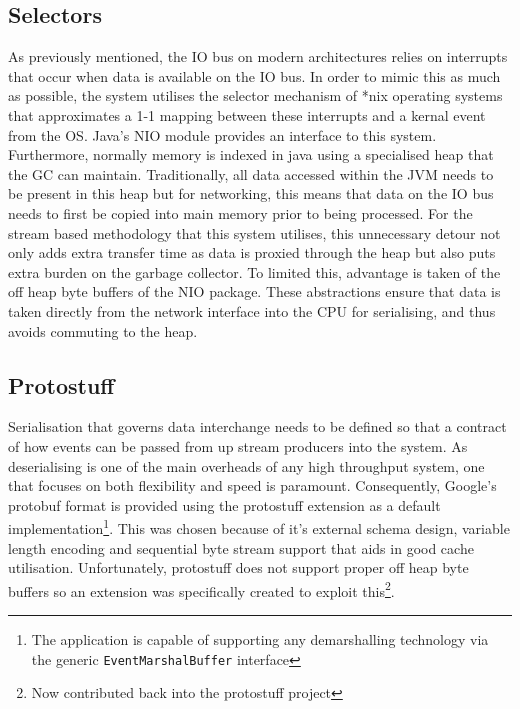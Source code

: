 \documentclass[a4paper,11pt]{scrreprt}
\begin{document}
\subsection{Selectors}
As previously mentioned, the IO bus on modern architectures relies on interrupts that occur when data is available on the IO bus. In order to mimic this as much as possible, the system utilises the selector mechanism of *nix operating systems that approximates a 1-1 mapping between these interrupts and a kernal event from the OS. Java's NIO module provides an interface to this system. Furthermore, normally memory is indexed in java using a specialised heap that the GC can maintain. Traditionally, all data accessed within the JVM needs to be present in this heap but for networking, this means that data on the IO bus needs to first be copied into main memory prior to being processed. For the stream based methodology that this system utilises, this unnecessary detour not only adds extra transfer time as data is proxied through the heap but also puts extra burden on the garbage collector.
To limited this, advantage is taken of the off heap byte buffers of the NIO package. These abstractions ensure that data is taken directly from the network interface into the CPU for serialising, and thus avoids commuting to the heap.
\subsection{Protostuff}
Serialisation that governs data interchange needs to be defined so that a contract of how events can be passed from up stream producers into the system. As deserialising is one of the main overheads of any high throughput system, one that focuses on both flexibility and speed is paramount. Consequently, Google's protobuf\cite{googleprotobuf} format is provided using the protostuff extension as a default implementation\footnote{The application is capable of supporting any demarshalling technology via the generic \texttt{EventMarshalBuffer} interface}. This was chosen because of it's external schema design, variable length encoding and sequential byte stream support that aids in good cache utilisation. Unfortunately, protostuff does not support proper off heap byte buffers so an extension was specifically created to exploit this\footnote{Now contributed back into the protostuff project}.
\end{document}
